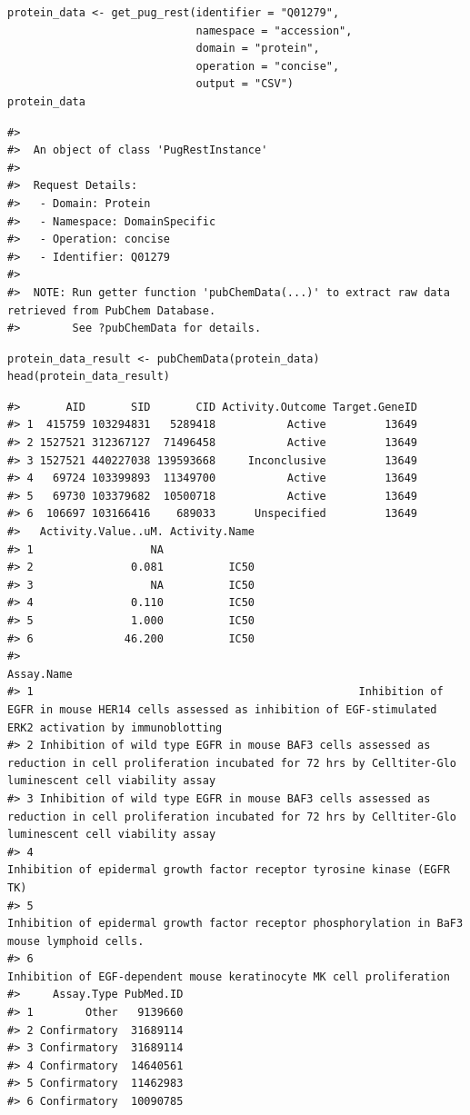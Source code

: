 \begin{verbatim}
protein_data <- get_pug_rest(identifier = "Q01279", 
                             namespace = "accession", 
                             domain = "protein", 
                             operation = "concise", 
                             output = "CSV")
protein_data
\end{verbatim}

\begin{verbatim}
#> 
#>  An object of class 'PugRestInstance'
#> 
#>  Request Details:  
#>   - Domain: Protein
#>   - Namespace: DomainSpecific
#>   - Operation: concise
#>   - Identifier: Q01279
#> 
#>  NOTE: Run getter function 'pubChemData(...)' to extract raw data retrieved from PubChem Database. 
#>        See ?pubChemData for details.
\end{verbatim}

\begin{verbatim}
protein_data_result <- pubChemData(protein_data)
head(protein_data_result)
\end{verbatim}

\begin{verbatim}
#>       AID       SID       CID Activity.Outcome Target.GeneID
#> 1  415759 103294831   5289418           Active         13649
#> 2 1527521 312367127  71496458           Active         13649
#> 3 1527521 440227038 139593668     Inconclusive         13649
#> 4   69724 103399893  11349700           Active         13649
#> 5   69730 103379682  10500718           Active         13649
#> 6  106697 103166416    689033      Unspecified         13649
#>   Activity.Value..uM. Activity.Name
#> 1                  NA              
#> 2               0.081          IC50
#> 3                  NA          IC50
#> 4               0.110          IC50
#> 5               1.000          IC50
#> 6              46.200          IC50
#>                                                                                                                                                            Assay.Name
#> 1                                                  Inhibition of EGFR in mouse HER14 cells assessed as inhibition of EGF-stimulated ERK2 activation by immunoblotting
#> 2 Inhibition of wild type EGFR in mouse BAF3 cells assessed as reduction in cell proliferation incubated for 72 hrs by Celltiter-Glo luminescent cell viability assay
#> 3 Inhibition of wild type EGFR in mouse BAF3 cells assessed as reduction in cell proliferation incubated for 72 hrs by Celltiter-Glo luminescent cell viability assay
#> 4                                                                                            Inhibition of epidermal growth factor receptor tyrosine kinase (EGFR TK)
#> 5                                                                        Inhibition of epidermal growth factor receptor phosphorylation in BaF3 mouse lymphoid cells.
#> 6                                                                                                Inhibition of EGF-dependent mouse keratinocyte MK cell proliferation
#>     Assay.Type PubMed.ID
#> 1        Other   9139660
#> 2 Confirmatory  31689114
#> 3 Confirmatory  31689114
#> 4 Confirmatory  14640561
#> 5 Confirmatory  11462983
#> 6 Confirmatory  10090785
\end{verbatim}

